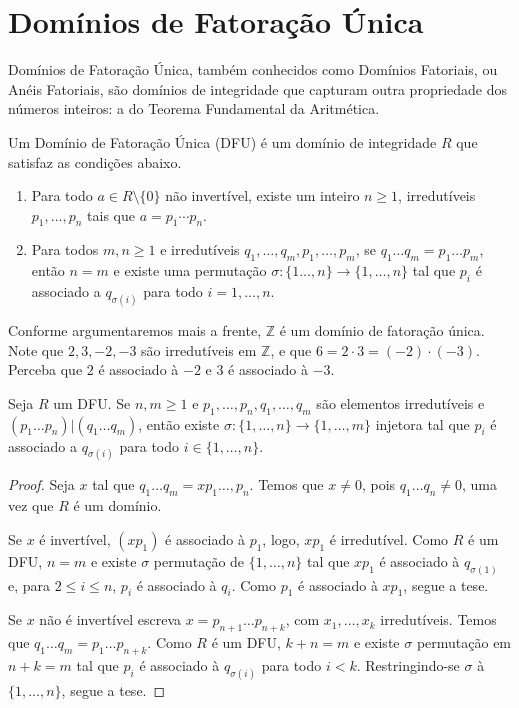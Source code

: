 \section{Domínios de Fatoração Única}
Domínios de Fatoração Única, também conhecidos como Domínios Fatoriais, ou Anéis Fatoriais, são domínios de integridade que capturam outra propriedade dos números inteiros:
a do Teorema Fundamental da Aritmética.

\begin{definition}
    Um Domínio de Fatoração Única (DFU) é um domínio de integridade $R$ que satisfaz as condições abaixo.
    
    \begin{enumerate}
        \item Para todo $a\in R\setminus \{0\}$ não invertível, existe um inteiro $n\geq 1$, irredutíveis $p_1, \dots, p_n$ tais que $a=p_1\cdots p_n$.
        \item Para todos $m, n\geq 1$ e irredutíveis $q_1, \dots, q_m, p_1, \dots, p_m$, se $q_1\dots q_m =p_1\dots p_m$, então $n=m$ e existe uma permutação $\sigma:\{1\dots, n\}\rightarrow \{1, \dots, n\}$ tal que $p_i$ é associado a $q_{\sigma(i)}$ para todo $i=1, \dots, n$.
    \end{enumerate}
\end{definition}

\begin{exemplo}
    Conforme argumentaremos mais a frente, $\mathbb Z$ é um domínio de fatoração única. Note que $2, 3, -2, -3$ são irredutíveis em $\mathbb Z$, e que $6=2\cdot 3=(-2)\cdot(-3)$. Perceba que $2$ é associado à $-2$ e $3$ é associado à $-3$.
\end{exemplo}

\begin{lemma}
    Seja $R$ um DFU. Se $n, m\geq 1$ e $p_1, \dots, p_n, q_1, \dots, q_m$ são elementos irredutíveis e $(p_1\dots p_n)|(q_1\dots q_m)$, então existe $\sigma:\{1, \dots, n\}\rightarrow\{1, \dots, m\}$ injetora tal que $p_i$ é associado a $q_{\sigma(i)}$ para todo $i \in \{1, \dots, n\}$. 
\end{lemma}
\begin{proof}
    Seja $x$ tal que $q_1 \dots q_m=x p_1\dots, p_n$. Temos que $x\neq 0$, pois $q_1\dots q_n\neq 0$, uma vez que $R$ é um domínio.

    Se $x$ é invertível, $(xp_1)$ é associado à $p_1$, logo, $x p_1$ é irredutível. Como $R$ é um DFU, $n=m$ e existe $\sigma$ permutação de $\{1, \dots, n\}$ tal que $xp_1$ é associado à $q_{\sigma(1)}$ e, para $2\leq i\leq n$, $p_i$ é associado à $q_i$. Como $p_1$ é associado à $xp_1$, segue a tese.

    Se $x$ não é invertível escreva $x=p_{n+1}\dots p_{n+k}$, com $x_1, \dots, x_k$ irredutíveis. Temos que $q_1\dots q_m=p_1\dots p_{n+k}$. Como $R$ é um DFU, $k+n=m$ e existe $\sigma$ permutação em $n+k=m$ tal que $p_i$ é associado à $q_{\sigma(i)}$ para todo $i<k$. Restringindo-se $\sigma$ à $\{1, \dots, n\}$, segue a tese.
\end{proof}

